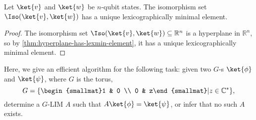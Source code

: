 \begin{corollary}
	Let $\ket{v}$ and $\ket{w}$ be $n$-qubit states.
	The isomorphism set $\Iso(\ket{v},\ket{w})$ has a unique lexicographically minimal element.
\end{corollary}
\begin{proof}
	The isomorphism set $\Iso(\ket{v},\ket{w})\subseteq\mathbb R^n$ is a hyperplane in $\mathbb R^n$, so by \autoref{thm:hyperplane-has-lexmin-element}, it has a unique lexicographically minimal element.
\end{proof}











Here, we give an efficient algorithm for the following task: given two $G$-\limdd s $\ket{\phi}$ and $\ket{\psi}$, where $G$ is the torus,
\[
G = 
\{
\begin{smallmat}1 & 0 \\ 0 & z\end{smallmat}
    |
    z \in \mathbb{C}^*
\}
,
\]
determine a $G$-LIM $A$ such that $A \ket{\phi} = \ket{\psi}$, or infer that no such $A$ exists.

